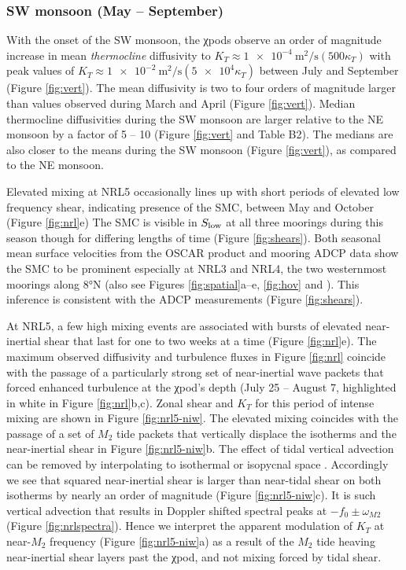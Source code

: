 \documentclass[twocol]{ametsoc}
\begin{document}
\subsubsection*{SW monsoon (May -- September)}
\label{sec:orgec06087}

With the onset of the SW monsoon, the χpods observe an order of magnitude increase in mean \emph{thermocline} diffusivity to \(K_T \approx \SI{1e-4}{\m\squared\per\s} (500κ_T)\) with peak values of \(K_T \approx \SI{1e-2}{\m\squared\per\s} (\num{5e4}κ_T)\) between July and September (Figure \ref{fig:vert}).
The mean diffusivity is two to four orders of magnitude larger than values observed during March and April (Figure \ref{fig:vert}).
Median thermocline diffusivities during the SW monsoon are larger relative to the NE monsoon by a factor of 5 -- 10 (Figure \ref{fig:vert} and Table B2).
The medians are also closer to the means during the SW monsoon (Figure \ref{fig:vert}), as compared to the NE monsoon.

Elevated mixing at NRL5 occasionally lines up with short periods of elevated low frequency shear, indicating presence of the SMC, between May and October (Figure \ref{fig:nrl}e)
The SMC is visible in \(S_\text{low}\) at all three moorings during this season though for differing lengths of time (Figure \ref{fig:shears}).
Both seasonal mean surface velocities from the OSCAR product and mooring ADCP data show the SMC to be prominent especially at NRL3 and NRL4, the two westernmost moorings along 8°N (also see Figures \ref{fig:spatial}a--e, \ref{fig:hov} and \citealp{Wijesekera2016a}).
This inference is consistent with the ADCP measurements (Figure \ref{fig:shears}).

At NRL5, a few high mixing events are associated with bursts of elevated near-inertial shear that last for one to two weeks at a time  (Figure \ref{fig:nrl}e).
The maximum observed diffusivity and turbulence fluxes in Figure \ref{fig:nrl} coincide with the passage of a particularly strong set of near-inertial wave packets that forced enhanced turbulence at the χpod's depth (July 25 -- August 7, highlighted in white in Figure \ref{fig:nrl}b,c).
Zonal shear and \(K_T\) for this period of intense mixing are shown in Figure \ref{fig:nrl5-niw}.
The elevated mixing coincides with the passage of a set of \(M_2\) tide packets that vertically displace the isotherms and the near-inertial shear in Figure \ref{fig:nrl5-niw}b.
The effect of tidal vertical advection can be removed by interpolating to isothermal or isopycnal space \citep{Alford2001a}.
Accordingly we see that squared near-inertial shear is larger than near-tidal shear on both isotherms by nearly an order of magnitude (Figure \ref{fig:nrl5-niw}c).
It is such vertical advection that results in Doppler shifted spectral peaks at \(-f_0 \pm ω_{M2}\) (Figure \ref{fig:nrlspectra}).
Hence we interpret the apparent modulation of \(K_T\) at near-\(M_2\) frequency (Figure \ref{fig:nrl5-niw}a) as a result of the \(M_2\) tide heaving near-inertial shear layers past the χpod, and not mixing forced by tidal shear.
\end{document}
